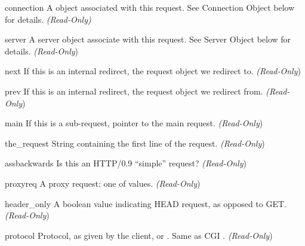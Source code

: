 \begin{memberdesc}[request]{connection}
  A  object associated with this request. See
  Connection Object below for details.
  \emph{(Read-Only)}
\end{memberdesc}

\begin{memberdesc}[request]{server}
  A server object associate with this request. See Server Object below
  for details.
  \emph{(Read-Only})
\end{memberdesc}

\begin{memberdesc}[request]{next}
  If this is an internal redirect, the request object we redirect to. 
  \emph{(Read-Only})
\end{memberdesc}

\begin{memberdesc}[request]{prev}
  If this is an internal redirect, the request object we redirect from.
  \emph{(Read-Only})
\end{memberdesc}

\begin{memberdesc}[request]{main}
  If this is a sub-request, pointer to the main request. 
  \emph{(Read-Only})
\end{memberdesc}

\begin{memberdesc}[request]{the_request}
  String containing the first line of the request.
  \emph{(Read-Only})
\end{memberdesc}

\begin{memberdesc}[request]{assbackwards}
  Is this an HTTP/0.9 ``simple'' request? 
  \emph{(Read-Only})
\end{memberdesc}

\begin{memberdesc}[request]{proxyreq}
  A proxy request: one of  values.
  \emph{(Read-Only})
\end{memberdesc}

\begin{memberdesc}[request]{header_only}
  A boolean value indicating HEAD request, as opposed to GET. 
  \emph{(Read-Only})
\end{memberdesc}

\begin{memberdesc}[request]{protocol}
  Protocol, as given by the client, or . Same as CGI .
  \emph{(Read-Only})
\end{memberdesc}

